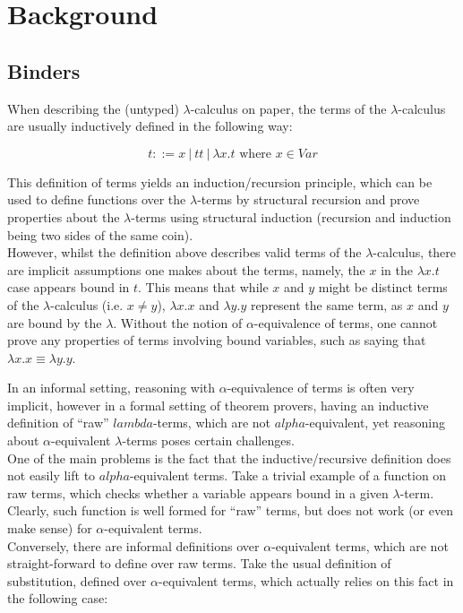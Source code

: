 \documentclass[a4paper, 12pt, twoside]{style/ociamthesis}
\theoremstyle{plain}
\theoremstyle{definition}
\theoremstyle{remark}
\begin{document}
\chapter{Background}\label{background}

\hypertarget{binders}{\section{Binders}\label{binders}}

When describing the (untyped) \(\lambda\)-calculus on paper, the terms
of the \(\lambda\)-calculus are usually inductively defined in the
following way:

\[t::= x\ |\ tt\ |\ \lambda x.t \text{ where }x \in Var\]

This definition of terms yields an induction/recursion principle, which
can be used to define functions over the \(\lambda\)-terms by structural
recursion and prove properties about the \(\lambda\)-terms using
structural induction (recursion and induction being two sides of the
same coin).\\
However, whilst the definition above describes valid terms of the
\(\lambda\)-calculus, there are implicit assumptions one makes about the
terms, namely, the \(x\) in the \(\lambda x.t\) case appears bound in
\(t\). This means that while \(x\) and \(y\) might be distinct terms of
the \(\lambda\)-calculus (i.e. \(x \neq y\)), \(\lambda x.x\) and
\(\lambda y.y\) represent the same term, as \(x\) and \(y\) are bound by
the \(\lambda\). Without the notion of \(\alpha\)-equivalence of terms,
one cannot prove any properties of terms involving bound variables, such
as saying that \(\lambda x.x \equiv \lambda y.y\).

In an informal setting, reasoning with \(\alpha\)-equivalence of terms
is often very implicit, however in a formal setting of theorem provers,
having an inductive definition of ``raw'' \(lambda\)-terms, which are
not \(alpha\)-equivalent, yet reasoning about \(\alpha\)-equivalent
\(\lambda\)-terms poses certain challenges.\\
One of the main problems is the fact that the inductive/recursive
definition does not easily lift to \(alpha\)-equivalent terms. Take a
trivial example of a function on raw terms, which checks whether a
variable appears bound in a given \(\lambda\)-term. Clearly, such
function is well formed for ``raw'' terms, but does not work (or even
make sense) for \(\alpha\)-equivalent terms.\\
Conversely, there are informal definitions over \(\alpha\)-equivalent
terms, which are not straight-forward to define over raw terms. Take the
usual definition of substitution, defined over \(\alpha\)-equivalent
terms, which actually relies on this fact in the following case:
\end{document}
